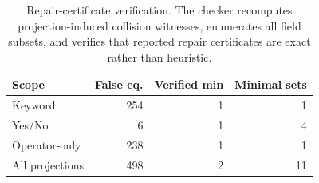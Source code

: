 \begin{table}[H]
\centering
\caption{Repair-certificate verification. The checker recomputes projection-induced collision witnesses, enumerates all field subsets, and verifies that reported repair certificates are exact rather than heuristic.}
\label{tab:repair-cert-verification}
\small
\begin{tabular}{lrrr}
\toprule
Scope & False eq. & Verified min & Minimal sets \\
\midrule
Keyword & 254 & 1 & 1 \\
Yes/No & 6 & 1 & 4 \\
Operator-only & 238 & 1 & 1 \\
All projections & 498 & 2 & 11 \\
\bottomrule
\end{tabular}
\end{table}
